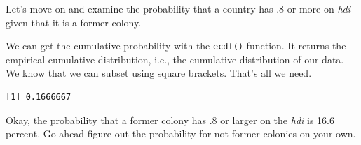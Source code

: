 \documentclass[]{book}
\newenvironment{Shaded}{\begin{snugshade}}{\end{snugshade}}
\newcommand{\KeywordTok}[1]{\textcolor[rgb]{0.13,0.29,0.53}{\textbf{#1}}}
\newcommand{\DecValTok}[1]{\textcolor[rgb]{0.00,0.00,0.81}{#1}}
\newcommand{\StringTok}[1]{\textcolor[rgb]{0.31,0.60,0.02}{#1}}
\newcommand{\OperatorTok}[1]{\textcolor[rgb]{0.81,0.36,0.00}{\textbf{#1}}}
\newcommand{\NormalTok}[1]{#1}
\theoremstyle{definition}
\theoremstyle{definition}
\theoremstyle{definition}
\theoremstyle{remark}
\begin{document}
Let's move on and examine the probability that a country has .8 or more
on \emph{hdi} given that it is a former colony.

We can get the cumulative probability with the \texttt{ecdf()} function.
It returns the empirical cumulative distribution, i.e., the cumulative
distribution of our data. We know that we can subset using square
brackets. That's all we need.

\begin{Shaded}
\end{Shaded}

\begin{verbatim}
[1] 0.1666667
\end{verbatim}

Okay, the probability that a former colony has .8 or larger on the
\emph{hdi} is 16.6 percent. Go ahead figure out the probability for not
former colonies on your own.
\end{document}
